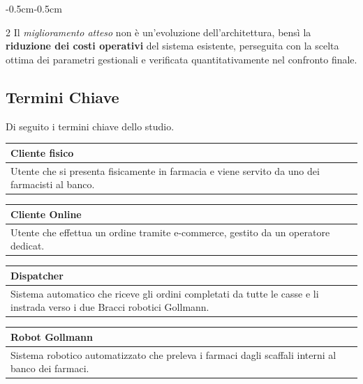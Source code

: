 \documentclass{article}
\begin{document}
\begin{adjustwidth}{-0.5cm}{-0.5cm}
\begin{multicols}{2}
Il \emph{miglioramento atteso} non è
un'evoluzione dell'architettura, bensì la \textbf{riduzione dei costi operativi} del sistema
esistente, perseguita con la scelta ottima dei parametri gestionali e verificata
quantitativamente nel confronto finale.
\vspace{-1pt}
\subsection*{Termini Chiave}
Di seguito i termini chiave dello studio.

\begin{minipage}{\linewidth}
\centering
\begin{tabularx}{\linewidth}{|X|}
  \hline
  \textbf{Cliente fisico} \\
  \hline
  Utente che si presenta fisicamente in farmacia e viene servito da uno dei farmacisti al banco.\\
  \hline
\end{tabularx}
\end{minipage}

\begin{minipage}{\linewidth}
\centering
\begin{tabularx}{\linewidth}{|X|}
  \hline
  \textbf{Cliente Online} \\
  \hline
  Utente che effettua un ordine tramite e-commerce, gestito da un operatore dedicat.\\
  \hline
\end{tabularx}
\end{minipage}

\begin{minipage}{\linewidth}
\centering
\begin{tabularx}{\linewidth}{|X|}
  \hline
  \textbf{Dispatcher} \\
  \hline
  Sistema automatico che riceve gli ordini completati da tutte le casse e li instrada verso i due Bracci robotici Gollmann. \\
  \hline
\end{tabularx}
\end{minipage}

\begin{minipage}{\linewidth}
\centering
\begin{tabularx}{\linewidth}{|X|}
  \hline
  \textbf{Robot Gollmann} \\
  \hline
  Sistema robotico automatizzato che preleva i farmaci dagli scaffali interni al banco dei farmaci. \\
  \hline
\end{tabularx}
\end{minipage}


\end{multicols}
\end{adjustwidth}
\end{document}
